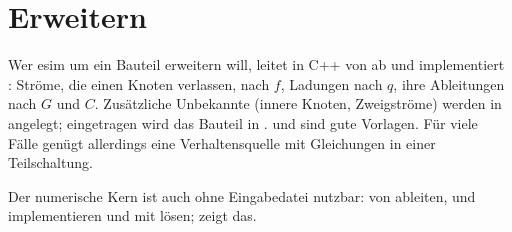 \section{Erweitern}

Wer esim um ein Bauteil erweitern will, leitet in C++ von  ab
und implementiert : Ströme, die einen Knoten verlassen, nach
$f$, Ladungen nach $q$, ihre Ableitungen nach $G$ und $C$. Zusätzliche
Unbekannte (innere Knoten, Zweigströme) werden in  angelegt;
eingetragen wird das Bauteil in .
 und  sind gute
Vorlagen. Für viele Fälle genügt allerdings eine Verhaltensquelle mit
Gleichungen in einer Teilschaltung.

Der numerische Kern ist auch ohne Eingabedatei nutzbar: von
 ableiten,  und 
implementieren und mit  lösen;
 zeigt das.
